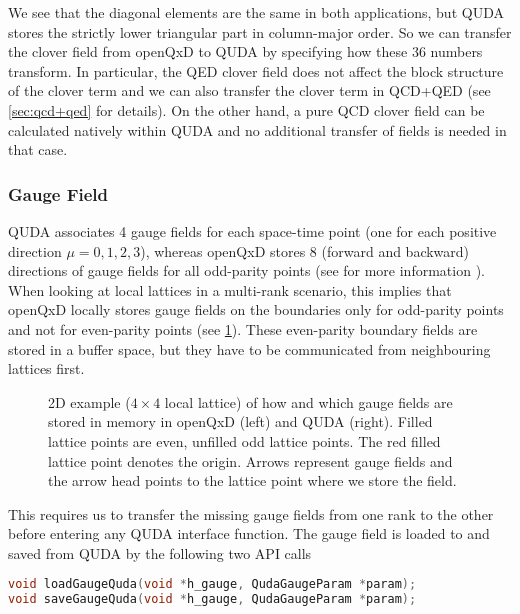 We see that the diagonal elements are the same in both applications, but QUDA stores the strictly lower triangular part in column-major order. 
So we can transfer the clover field from openQxD to QUDA by specifying how these 36 numbers transform. In particular, the QED
clover field does not affect the block structure of the clover term and we can also transfer the clover term in QCD+QED (see \cref{sec:qcd+qed}
for details).
On the other hand, a pure QCD clover field can be calculated natively within QUDA and no additional transfer of fields is needed in that case.

\subsubsection{Gauge Field}
    QUDA associates 4 gauge fields for each space-time point (one for each positive direction $\mu=0,1,2,3$), whereas openQxD stores $8$
    (forward and backward) directions of gauge fields for all odd-parity points (see  for more information \cite{openqxd}). When looking at local lattices in a multi-rank scenario, this implies that openQxD locally stores gauge fields on the boundaries only for odd-parity points and not for even-parity points (see \cref{fig:gauge}). These even-parity boundary fields are stored in a buffer space, but they have to be communicated from neighbouring lattices first.

\begin{figure}
  \caption{2D example ($4 \times 4$ local lattice) of how and which gauge fields are stored in memory in openQxD (left) and QUDA (right). Filled lattice points are even, unfilled odd lattice points. The red filled lattice point denotes the origin. Arrows represent gauge fields and the arrow head points to the lattice point where we store the field.}
  \label{fig:gauge}
\end{figure}

This requires us to transfer the missing gauge fields from one rank to the other before entering any QUDA interface function. The gauge field is loaded to and saved from QUDA by the following two API calls

\begin{lstlisting}[language=C++]
void loadGaugeQuda(void *h_gauge, QudaGaugeParam *param);
void saveGaugeQuda(void *h_gauge, QudaGaugeParam *param);
\end{lstlisting}

